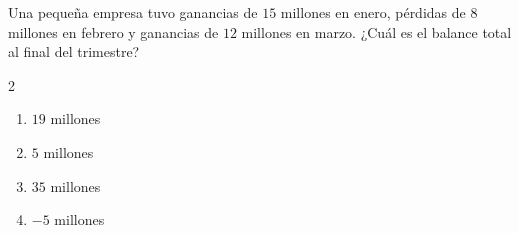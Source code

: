 Una pequeña empresa tuvo ganancias de $15$ millones en enero, pérdidas de $8$ millones en febrero y ganancias de $12$ millones en marzo. ¿Cuál es el balance total al final del trimestre?
\begin{multicols}{2}
\begin{enumerate}[label=\alph*)]
\item $19$ millones
\item $5$ millones
\item $35$ millones
\item $-5$ millones
\end{enumerate}
\end{multicols}